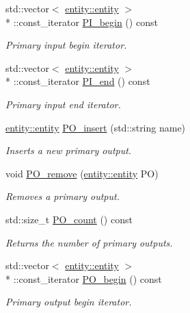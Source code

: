 \begin{DoxyCompactItemize}
std\-::vector$<$ \hyperlink{classophidian_1_1entity_1_1entity}{entity\-::entity} $>$\\*
\-::const\-\_\-iterator \hyperlink{classophidian_1_1netlist_1_1netlist_a9a5231c1f4ade9ecec2faae521c5c570}{P\-I\-\_\-begin} () const 
\begin{DoxyCompactList}\small\item\em Primary input begin iterator. \end{DoxyCompactList}\item 
std\-::vector$<$ \hyperlink{classophidian_1_1entity_1_1entity}{entity\-::entity} $>$\\*
\-::const\-\_\-iterator \hyperlink{classophidian_1_1netlist_1_1netlist_a4bbbb7fa49c1cdbd6d35613733154937}{P\-I\-\_\-end} () const 
\begin{DoxyCompactList}\small\item\em Primary input end iterator. \end{DoxyCompactList}\item 
\hyperlink{classophidian_1_1entity_1_1entity}{entity\-::entity} \hyperlink{classophidian_1_1netlist_1_1netlist_a1bfc2d689c0d62cd4678b730b7ec0b9a}{P\-O\-\_\-insert} (std\-::string name)
\begin{DoxyCompactList}\small\item\em Inserts a new primary output. \end{DoxyCompactList}\item 
void \hyperlink{classophidian_1_1netlist_1_1netlist_aece3c1b22962d5a182c47c4d715f6ad7}{P\-O\-\_\-remove} (\hyperlink{classophidian_1_1entity_1_1entity}{entity\-::entity} P\-O)
\begin{DoxyCompactList}\small\item\em Removes a primary output. \end{DoxyCompactList}\item 
std\-::size\-\_\-t \hyperlink{classophidian_1_1netlist_1_1netlist_a560619b3deea1b719a9280b0021144b1}{P\-O\-\_\-count} () const 
\begin{DoxyCompactList}\small\item\em Returns the number of primary outputs. \end{DoxyCompactList}\item 
std\-::vector$<$ \hyperlink{classophidian_1_1entity_1_1entity}{entity\-::entity} $>$\\*
\-::const\-\_\-iterator \hyperlink{classophidian_1_1netlist_1_1netlist_a8df1e9e6e2e4c3d07a9911366bde579f}{P\-O\-\_\-begin} () const 
\begin{DoxyCompactList}\small\item\em Primary output begin iterator. \end{DoxyCompactList}\item 

\end{DoxyCompactItemize}
